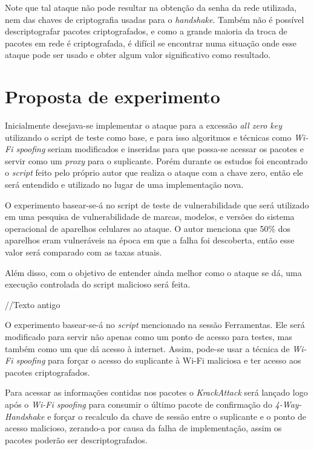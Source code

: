 \documentclass[12pt]{article}
\begin{document}
Note que tal ataque não pode resultar na obtenção da senha da rede utilizada, nem das chaves de criptografia usadas para o \textit{handshake}. Também não é possível descriptografar pacotes  criptografados, e como a grande maioria da troca de pacotes em rede é criptografada, é difícil se encontrar numa situação onde esse ataque pode ser usado e obter algum valor significativo como resultado.


\section{Proposta de experimento}
Inicialmente desejava-se implementar o ataque para a excessão \textit{all zero key} utilizando o script de teste como base, e para isso algoritmos e técnicas como \textit{Wi-Fi spoofing} seriam modificados e inseridas para que possa-se acessar os pacotes e servir como um \textit{proxy} para o suplicante. Porém durante os estudos foi encontrado o \textit{script} feito pelo próprio autor que realiza o ataque com a chave zero, então ele será entendido e utilizado no lugar de uma implementação nova.  

O experimento basear-se-á no script de teste de vulnerabilidade que será utilizado em uma pesquisa de vulnerabilidade de marcas, modelos, e versões do sistema operacional de aparelhos celulares ao ataque. O autor menciona que 50\% dos aparelhos eram vulneráveis na época em que a falha foi descoberta, então esse valor será comparado com as taxas atuais.

Além disso, com o objetivo de entender ainda melhor como o ataque se dá, uma execução controlada do script malicioso será feita. 

//Texto antigo

O experimento basear-se-á no \textit{script} mencionado na sessão Ferramentas. Ele será modificado para servir não apenas como um ponto de acesso para testes, mas também como um que dá acesso à internet. Assim, pode-se usar a técnica de \textit{Wi-Fi spoofing} para forçar o acesso do suplicante à Wi-Fi maliciosa e ter acesso aos pacotes criptografados.

Para acessar as informações contidas nos pacotes o \textit{KrackAttack} será lançado logo após o \textit{Wi-Fi spoofing} para consumir o último pacote de confirmação do \textit{4-Way-Handshake} e forçar o recalculo da chave de sessão entre o suplicante e o ponto de acesso malicioso, zerando-a por causa da falha de implementação, assim os pacotes poderão ser descriptografados.
\end{document}
